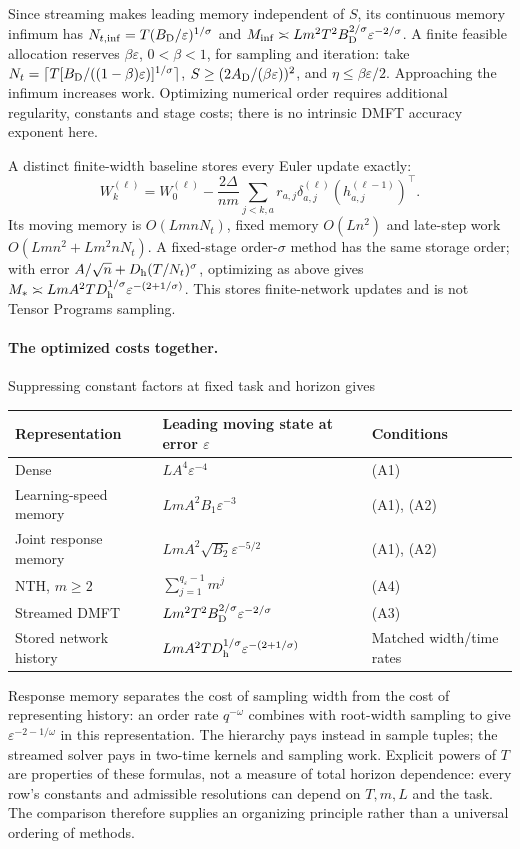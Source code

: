 Since streaming makes leading memory independent of $S$, its continuous
memory infimum has $N_{t,\inf}=T(B_{\rm D}/\varepsilon)^{1/\sigma}$ and
$M_{\inf}\asymp Lm^2T^2B_{\rm D}^{2/\sigma}\varepsilon^{-2/\sigma}$.
A finite feasible allocation reserves $\beta\varepsilon$, $0<\beta<1$,
for sampling and iteration: take
$N_t=\lceil T[B_{\rm D}/((1-\beta)\varepsilon)]^{1/\sigma}\rceil$,
$S\ge(2A_{\rm D}/(\beta\varepsilon))^2$, and
$\eta\le\beta\varepsilon/2$.  Approaching the infimum increases work.
Optimizing numerical order requires additional regularity, constants and
stage costs; there is no intrinsic DMFT accuracy exponent here.

A distinct finite-width baseline stores every Euler update exactly:
\[
 W^{(\ell)}_k=W^{(\ell)}_0-\frac{2\Delta}{nm}
 \sum_{j<k,a}r_{a,j}\delta^{(\ell)}_{a,j}(h^{(\ell-1)}_{a,j})^\top.
\]
Its moving memory is $O(LmnN_t)$, fixed memory $O(Ln^2)$ and late-step work
$O(Lmn^2+Lm^2nN_t)$.  A fixed-stage order-$\sigma$ method has the same storage
order; with error $A/\sqrt n+D_{\rm h}(T/N_t)^\sigma$, optimizing as above gives
$M_*\asymp LmA^2T D_{\rm h}^{1/\sigma}\varepsilon^{-(2+1/\sigma)}$.
This stores finite-network updates and is not Tensor Programs sampling.

\paragraph{The optimized costs together.}
Suppressing constant factors at fixed task and horizon gives
\begin{center}
\small
\begin{tabular}{@{}lll@{}}
\toprule
Representation & Leading moving state at error $\varepsilon$ & Conditions\\
\midrule
Dense & $LA^4\varepsilon^{-4}$ & (A1)\\
Learning-speed memory & $LmA^2B_1\varepsilon^{-3}$ & (A1), (A2)\\
Joint response memory & $LmA^2\sqrt{B_2}\varepsilon^{-5/2}$ & (A1), (A2)\\
NTH, $m\ge2$ & $\sum_{j=1}^{q_\varepsilon-1}m^j$ & (A4)\\
Streamed DMFT & $Lm^2T^2B_{\rm D}^{2/\sigma}\varepsilon^{-2/\sigma}$ & (A3)\\
Stored network history & $LmA^2T D_{\rm h}^{1/\sigma}\varepsilon^{-(2+1/\sigma)}$ &
Matched width/time rates\\
\bottomrule
\end{tabular}
\end{center}
Response memory separates the cost of sampling width from the cost of
representing history: an order rate $q^{-\omega}$ combines with root-width
sampling to give $\varepsilon^{-2-1/\omega}$ in this representation.
The hierarchy pays instead in sample tuples; the streamed solver pays in
two-time kernels and sampling work.  Explicit powers of $T$ are properties
of these formulas, not a measure of total horizon dependence: every row's
constants and admissible resolutions can depend on $T,m,L$ and the task.
The comparison therefore supplies an organizing principle rather than a
universal ordering of methods.

